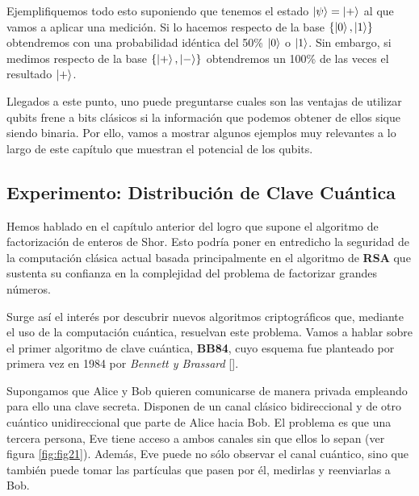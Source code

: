 Ejemplifiquemos todo esto suponiendo que tenemos el estado $\left|\psi\right\rangle=\left|+\right\rangle$ al que vamos a aplicar una medición. Si lo hacemos respecto de la base $\{\left|0\right\rangle,\left|1\right\rangle\}$ obtendremos con una probabilidad idéntica del 50\% $\left|0\right\rangle$ o $\left|1\right\rangle$. Sin embargo, si medimos respecto de la base $\{\left|+\right\rangle,\left|-\right\rangle\}$ obtendremos un 100\% de las veces el resultado $\left|+\right\rangle$. 

Llegados a este punto, uno puede preguntarse cuales son las ventajas de utilizar qubits frene a bits clásicos si la información que podemos obtener de ellos sique siendo binaria. Por ello, vamos a mostrar algunos ejemplos muy relevantes a lo largo de este capítulo que muestran el potencial de los qubits.

\subsection{Experimento: Distribución de Clave Cuántica}

Hemos hablado en el capítulo anterior del logro que supone el algoritmo de factorización de enteros de Shor. Esto podría poner en entredicho la seguridad de la computación clásica actual basada principalmente en el algoritmo de \textbf{RSA} que sustenta su confianza en la complejidad del problema de factorizar grandes números.

Surge así el interés por descubrir nuevos algoritmos criptográficos que, mediante el uso de la computación cuántica, resuelvan este problema. Vamos a hablar sobre el primer algoritmo de clave cuántica, \textbf{BB84}, cuyo esquema fue planteado por primera vez en 1984 por \textit{Bennett y Brassard} [\cite{bennett1987quantum}].

Supongamos que Alice y Bob quieren comunicarse de manera privada empleando para ello una clave secreta. Disponen de un canal clásico bidireccional y de otro cuántico unidireccional que parte de Alice hacia Bob. El problema es que una tercera persona, Eve tiene acceso a ambos canales sin que ellos lo sepan (ver figura \ref{fig:fig21}). Además, Eve puede no sólo observar el canal cuántico, sino que también puede tomar las partículas que pasen por él, medirlas y reenviarlas a Bob.


